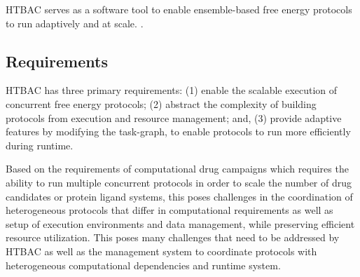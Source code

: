 HTBAC serves as a software tool to enable ensemble-based free energy protocols
to run adaptively and at scale. .




\subsection{Requirements}

HTBAC has three primary requirements: (1) enable the scalable execution of
concurrent free energy protocols; (2) abstract the complexity of building
protocols
from execution and resource management; and, (3) provide
adaptive features by modifying the task-graph, to enable protocols to run more 
efficiently during runtime.  


Based on the requirements of computational drug campaigns  
which requires the ability to run multiple concurrent protocols in order to 
scale the number of drug candidates or protein ligand systems, this poses 
challenges in the coordination of heterogeneous protocols that differ in 
computational requirements as well as setup of execution environments and data
management, while preserving efficient resource utilization.  This poses many 
challenges that need to be addressed by HTBAC as well as the management system 
to coordinate protocols with heterogeneous computational dependencies and 
runtime system. 

